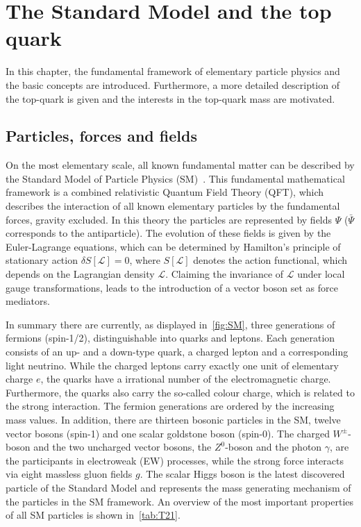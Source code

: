 \chapter{The Standard Model and the top quark}
\label{sec:SM1}
In this chapter, the fundamental framework of elementary particle physics and the basic concepts are introduced. Furthermore, a more detailed  description of the top-quark is given and the interests in the top-quark mass are motivated.  

\section{Particles, forces and fields}\label{key:SM 2}


\clearpage


On the most elementary scale, all known fundamental matter can be described by the Standard Model of Particle Physics (SM)~\cite{Glashow:1961tr,Glashow:1970gm,Gross:1973ju,Politzer:1973fx,Politzer:1974fr,Salam:1964ry,Weinberg:1967tq}. This fundamental mathematical framework is a combined relativistic Quantum Field Theory (QFT), which describes the interaction of all known elementary particles by the fundamental forces, gravity excluded.
In this theory the particles are represented by fields $\Psi$ ($\bar{\Psi}$  corresponds to the antiparticle). The evolution of these fields is given by the Euler-Lagrange equations, which can be determined by Hamilton's principle of stationary action $\delta S[\mathscr{L}] \!= 0 $, where $S[\mathscr{L}] $ denotes the action functional, which depends on the Lagrangian density $\mathscr{L} $. Claiming the invariance of
$\mathscr{L}$ under local gauge transformations, leads to the introduction of a  vector boson set as force mediators.

 In summary there are currently, as displayed in~\cref{fig:SM}, three generations of fermions (spin-1/2), distinguishable into quarks and leptons. Each generation consists of an up- and a down-type quark, a charged lepton and a corresponding light neutrino. While the charged leptons carry exactly one unit of elementary charge $e$, the quarks have  a irrational number of the electromagnetic charge. Furthermore, the quarks also carry the so-called colour charge, which is related to the strong interaction. The fermion generations are ordered by the increasing mass values.
In addition, there are thirteen bosonic particles in the SM, twelve vector bosons (spin-1) and one scalar goldstone boson (spin-0).
 The charged $W^{\pm}$-boson and the two uncharged vector bosons, the $Z^0$-boson and the photon $ \gamma$, are the participants in electroweak (EW) processes, while the strong force interacts via eight massless gluon fields $g$. The scalar Higgs boson is the latest discovered particle of the Standard Model and represents the mass generating mechanism of the particles in the SM framework. An overview of the most important properties of all SM particles is shown in~\cref{tab:T21}. 
 
